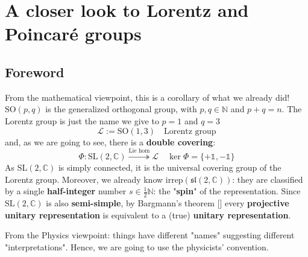 \documentclass[../main.tex]{subfiles}
\begin{document}
\setchapterpreamble[u]{\margintoc}
\chapter[A closer look to Lorentz and Poincaré group]{A closer look to Lorentz and Poincaré groups\footnotemark[0]}
\section{Foreword}
From the mathematical viewpoint, this is a corollary of what we already did! $\textrm{SO}(p,q)$ is the generalized orthogonal group, with $p,q\in\mathbb{N}$ and $p+q=n$. The Lorentz group is just the name we give to $p=1$ and $q=3$
\[
\mathcal{L}:=\textrm{SO}(1,3)\quad  \textrm{Lorentz group}
\]
and, as we are going to see, there is a \textbf{double covering}:
\[
\Phi:\text{SL}(2,\mathbb{C})\overset{\textrm{Lie hom}}{\twoheadrightarrow}\mathcal{L} \quad \ker\Phi=\{+\mathbb{1},-\mathbb{1}\}
\]
As $\textrm{SL}(2,\mathbb{C})$ is simply connected, it is the universal covering group of the Lorentz group. Moreover, we already know $\textrm{irrep}(\mathfrak{sl}(2,\mathbb{C}))$: they are classified by a single \textbf{half-integer} number  $s\in\frac{1}{2}\mathbb{N}$: the "\textbf{spin}" of the representation. Since SL$(2,\mathbb{C})$ is also \textbf{semi-simple}, by Bargmann's theorem [] every \textbf{projective unitary representation} is equivalent to a (true) \textbf{unitary representation}. 

From the Physics viewpoint: things have different "names" suggesting different "interpretations". Hence, we are going to use the physicists' convention.
\end{document}
